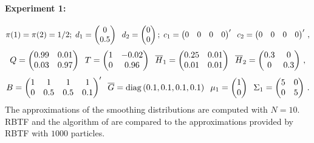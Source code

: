 \paragraph{Experiment 1:}
\[
\pi(1)=\pi(2) = 1/2\\;\;d_1 = \begin{pmatrix}0 \\ 0.5 \end{pmatrix}\;\; d_2 = \begin{pmatrix}0 \\ 0\end{pmatrix}\\;\;c_1= \begin{pmatrix}0 & 0& 0 & 0 \end{pmatrix}'\;\;c_2 =\begin{pmatrix}0 & 0 & 0 & 0 \end{pmatrix}'\,,
\]
\[
Q = \begin{pmatrix}0.99 & 0.01\\ 0.03 & 0.97\end{pmatrix}\;\;T = \begin{pmatrix}1 & -0.02\\ 0 & 0.96\end{pmatrix}\;\;\overline{H}_1 = \begin{pmatrix}0.25 & 0.01\\ 0.01 & 0.01\end{pmatrix}\;\;\overline{H}_2 = \begin{pmatrix}0.3 & 0\\ 0 & 0.3\end{pmatrix}\,,
\]
\[
B = \begin{pmatrix}1 & 1 & 1 & 1\\ 0 & 0.5 & 0.5 & 0.1 \end{pmatrix}'\;\; \overline{G} = \mathrm{diag}\left(0.1,0.1,0.1,0.1\right)\;\; \mu_1 = \begin{pmatrix}1 \\ 0\end{pmatrix}\;\; \Sigma_1 = \begin{pmatrix} 5 & 0 \\ 0  & 5\end{pmatrix}\,.
\]
The approximations of the smoothing distributions are computed with $N=10$. RBTF and the algorithm of \cite{briers:doucet:maskell:2010} are compared to the approximations provided by RBTF with $1000$ particles. 

